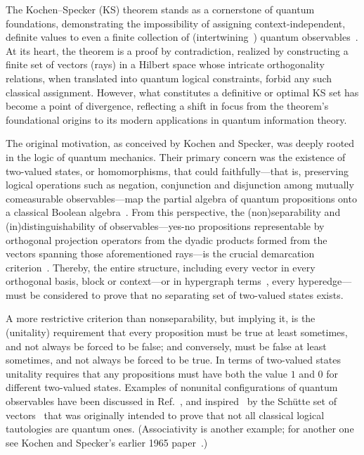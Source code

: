 \documentclass[%
  reprint,
  superscriptaddress,
  showpacs,
  showkeys,
  amsmath,amssymb,
  pra,
  longbibliography,
  floatfix,
  x11names
]{revtex4-2}
\begin{document}
The Kochen--Specker (KS) theorem stands as a cornerstone of quantum foundations, demonstrating the impossibility of assigning context-independent,
definite values to even a finite collection of (intertwining~\cite{gleason}) quantum observables~\cite{kochen1}.
At its heart, the theorem is a proof by contradiction, realized by constructing a finite set of vectors (rays)
in a Hilbert space whose intricate orthogonality relations, when translated into quantum logical constraints, forbid any such classical assignment.
However, what constitutes a definitive or optimal KS set has become a point of divergence,
reflecting a shift in focus from the theorem's foundational origins to its modern applications in quantum information theory.

The original motivation, as conceived by Kochen and Specker, was deeply rooted in the logic of quantum mechanics.
Their primary concern was the existence of two-valued states, or homomorphisms,
that could faithfully---that is, preserving logical operations such as negation, conjunction and disjunction among mutually comeasurable observables---map the partial algebra of quantum propositions onto a classical Boolean algebra~\cite{specker-60,kochen1}.
From this perspective, the (non)separability and (in)distinguishability of observables---yes-no propositions representable by orthogonal projection operators from the dyadic products formed from the vectors spanning those aforementioned rays---is the crucial demarcation criterion~\cite[Theorem~0]{kochen1}.
Thereby, the entire structure, including every vector in every orthogonal basis, block or context---or
in hypergraph terms~\cite{Bretto-MR3077516,svozil-2021-chroma}, every hyperedge---must be considered to prove that no separating set of two-valued states exists.

A more restrictive criterion than nonseparability, but implying it, is the (unitality) requirement that every proposition must be true at least sometimes,
and not always be forced to be false; and conversely, must be false at least sometimes,
and not always be forced to be true.
In terms of two-valued states unitality requires that
any propositions must have both the value $1$ and $0$ for different two-valued states.
Examples of nonunital configurations of quantum observables have been
discussed in Ref.~\cite[Proposition~7.3]{svozil-tkadlec}, and inspired~\cite{bub,tkadlec-96}
by the Sch\"utte set of vectors~\cite{Schuette,clavadetscher}
that was originally intended to prove that not all classical logical tautologies
are quantum ones. (Associativity is another example; for another one see Kochen and Specker's earlier 1965 paper~\cite{kochen2}.)
\end{document}
